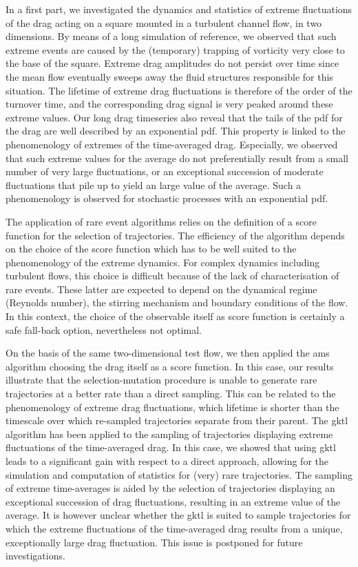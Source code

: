 \documentclass[pre,aps,floatfix,10pt,superscriptaddress, notitlepage,preprint]{revtex4-1}
\begin{document}
In a first part, we investigated the dynamics and statistics of extreme fluctuations of the drag acting on a square mounted in a turbulent channel flow, in two dimensions.
By means of a long simulation of reference, we observed that such extreme events are caused by the (temporary) trapping of vorticity very close to the base of the square.
Extreme drag amplitudes do not persist over time since the mean flow eventually sweeps away the fluid structures responsible for this situation.
%
The lifetime of extreme drag fluctuations is therefore of the order of the turnover time, and the corresponding drag signal is very peaked around these extreme values.
Our long drag timeseries also reveal that the tails of the \ac{pdf} for the drag are well described by an exponential \ac{pdf}.
This property is linked to the phenomenology of extremes of the time-averaged drag.
Especially, we observed that such extreme values for the average do not preferentially result from a small number of very large fluctuations, or an exceptional succession of moderate fluctuations that pile up to yield an large value of the average.
Such a phenomenology is observed for stochastic processes with an exponential \ac{pdf}.

The application of rare event algorithms relies on the definition of a score function for the selection of trajectories.
The efficiency of the algorithm depends on the choice of the score function which has to be well suited to the phenomenology of the extreme dynamics.
For complex dynamics including turbulent flows, this choice is  difficult because of the lack of characterisation of rare events. These latter are expected to depend on the dynamical regime (Reynolds number), the stirring mechanism and boundary conditions of the flow. In this context, the choice of the observable itself as score function is certainly a safe fall-back option, nevertheless not optimal.

On the basis of the same two-dimensional test flow, we then applied the \ac{ams} algorithm choosing the drag itself as a score function.
In this case, our results illustrate that the selection-mutation procedure is unable to generate rare trajectories at a better rate than a direct sampling.
This can be related to the phenomenology of extreme drag fluctuations, which lifetime is shorter than the timescale over which re-sampled trajectories separate from their parent. 
The \ac{gktl} algorithm has been applied to the sampling of trajectories displaying extreme fluctuations of the time-averaged drag.
In this case, we showed that using \ac{gktl} leads to a significant gain with respect to a direct approach, allowing for the simulation and computation of statistics for (very) rare trajectories.
The sampling of extreme time-averages is aided by the selection of trajectories displaying an exceptional succession of drag fluctuations, resulting in an extreme value of the average.
It is however unclear whether the \ac{gktl} is suited to sample trajectories for which the extreme fluctuations of the time-averaged drag results from a unique, exceptionally large drag fluctuation. This issue is postponed for future investigations.
\end{document}
